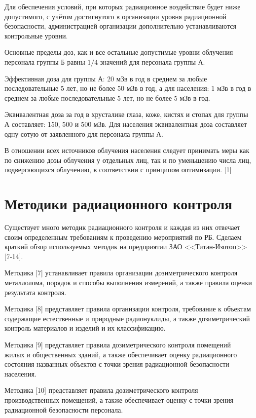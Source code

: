 	Для обеспечения условий, при которых радиационное воздействие будет ниже 
	допустимого, с учётом достигнутого в организации уровня радиационной 
	безопасности, администрацией организации дополнительно устанавливаются 
	контрольные уровни.

	Основные пределы доз, как и все остальные допустимые уровни облучения 
	персонала группы Б равны \( 1/4 \) значений для персонала группы А.

	Эффективная доза для группы А: 20 мЗв в год в среднем за любые 
	последовательные 5 лет, но не более 50 мЗв в год, а для населения:
	1 мЗв в год в среднем за любые последовательные 5 лет, но не более 
	5 мЗв в год.

	Эквивалентная доза за год в хрусталике глаза, коже, кистях и стопах 
	для группы А составляет: 150, 500 и 500 мЗв. Для населения эквивалентная 
	доза составляет одну сотую от заявленного для персонала группы А.

	В отношении всех источников облучения населения следует принимать 
	меры как по снижению дозы облучения у отдельных лиц, так и по 
	уменьшению числа лиц, подвергающихся облучению, в соответствии с 
	принципом оптимизации. [1]

\section{Методики радиационного контроля}
	Существует много методик радиационного контроля и каждая из них отвечает 
	своим определенным требованиям к проведению мероприятий по РБ. Сделаем 
	краткий обзор используемых методик на предприятии ЗАО 
	<<Титан-Изотоп>> [7-14].

	Методика [7] устанавливает правила организации дозиметрического 
    контроля металлолома, порядок и способы выполнения измерений, а 
    также правила оценки результата контроля.

	Методика [8] представляет правила организации контроля, требование к 
    объектам содержащие естественные и природные радионуклиды, а также 
    дозиметрический контроль материалов и изделий и их классификацию.

	Методика [9] представляет правила дозиметрического контроля помещений 
	жилых и общественных зданий, а также обеспечивает оценку радиационного 
	состояния названных объектов с точки зрения радиационной безопасности 
	населения. 

	Методика [10] представляет правила дозиметрического контроля 
    производственных помещений, а также обеспечивает оценку с точки 
    зрения радиационной безопасности персонала.

